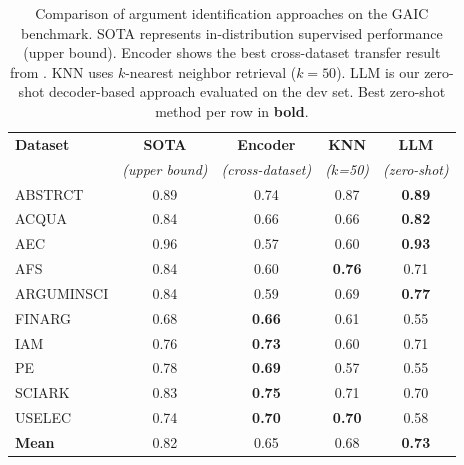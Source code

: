 \begin{table}[ht]
\centering
\caption{Comparison of argument identification approaches on the GAIC benchmark.
SOTA represents in-distribution supervised performance (upper bound).
Encoder shows the best cross-dataset transfer result from \citet{Feger2025-kz}.
KNN uses $k$-nearest neighbor retrieval ($k=50$).
LLM is our zero-shot decoder-based approach evaluated on the dev set.
Best zero-shot method per row in \textbf{bold}.}
\label{tab:combined_results}
\begin{tabular}{lcccc}
\toprule
\textbf{Dataset} & \textbf{SOTA} & \textbf{Encoder} & \textbf{KNN} & \textbf{LLM} \\
                 & \textit{(upper bound)} & \textit{(cross-dataset)} & \textit{($k$=50)} & \textit{(zero-shot)} \\
\midrule
ABSTRCT     & 0.89 & 0.74          & 0.87          & \textbf{0.89} \\
ACQUA       & 0.84 & 0.66          & 0.66          & \textbf{0.82} \\
AEC         & 0.96 & 0.57          & 0.60          & \textbf{0.93} \\
AFS         & 0.84 & 0.60          & \textbf{0.76} & 0.71 \\
ARGUMINSCI  & 0.84 & 0.59          & 0.69          & \textbf{0.77} \\
FINARG      & 0.68 & \textbf{0.66} & 0.61          & 0.55 \\
IAM         & 0.76 & \textbf{0.73} & 0.60          & 0.71 \\
PE          & 0.78 & \textbf{0.69} & 0.57          & 0.55 \\
SCIARK      & 0.83 & \textbf{0.75} & 0.71          & 0.70 \\
USELEC      & 0.74 & \textbf{0.70} & \textbf{0.70} & 0.58 \\
\midrule
\textbf{Mean} & 0.82 & 0.65 & 0.68 & \textbf{0.73} \\
\bottomrule
\end{tabular}
\end{table}
